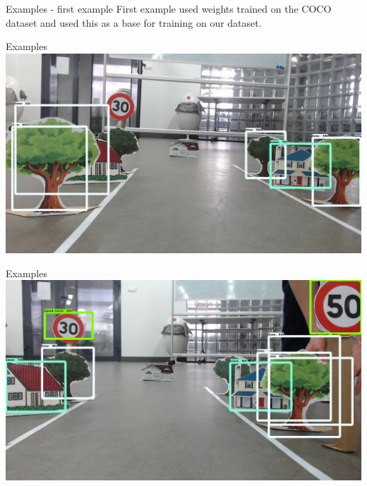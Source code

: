 \documentclass[aspectratio=1610,english]{beamer} %
\begin{document}
  	\begin{frame}{Examples - first example}
		First example used weights trained on the COCO dataset and used this as a base for training on our dataset.
	\end{frame}
  	\begin{frame}{Examples}
		\includegraphics[scale=0.3]{examples/comparison_1000_step/session_one-6.jpg}
	\end{frame}
  	\begin{frame}{Examples}
		\includegraphics[scale=0.3]{examples/comparison_1000_step/session_one-10.jpg}
	\end{frame}
	
\end{document}
